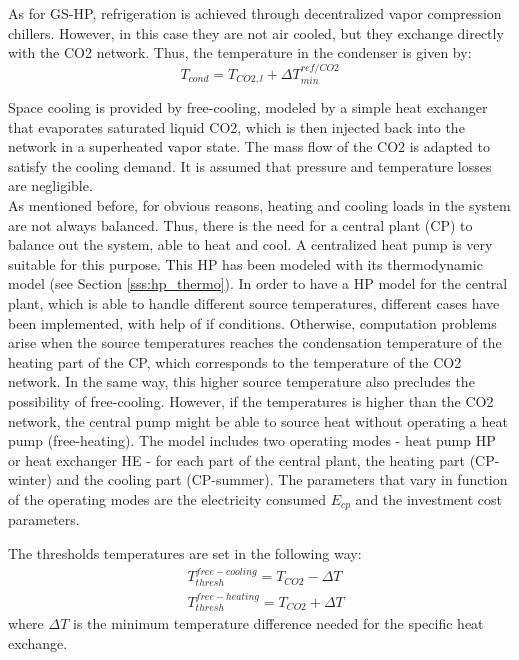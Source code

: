 \documentclass{article}
\begin{document}
As for GS-HP, refrigeration is achieved through decentralized vapor compression chillers. However, in this case they are not air cooled, but they exchange directly with the CO2 network. Thus, the temperature in the condenser is given by:
\begin{equation}
    T_{cond} = T_{CO2,l} + \Delta T_{min}^{ref/CO2}
\end{equation}

Space cooling is provided by free-cooling, modeled by a simple heat exchanger that evaporates saturated liquid CO2, which is then injected back into the network in a superheated vapor state. The mass flow of the CO2 is adapted to satisfy the cooling demand. It is assumed that pressure and temperature losses are negligible.\\

As mentioned before, for obvious reasons, heating and cooling loads in the system are not always balanced. Thus, there is the need for a central plant (CP) to balance out the system, able to heat and cool. A centralized heat pump is very suitable for this purpose. This HP has been modeled with its thermodynamic model (see Section \ref{sss:hp_thermo}).
In order to have a HP model for the central plant, which is able to handle different source temperatures, different cases have been implemented, with help of if conditions. Otherwise, computation problems arise when the source temperatures reaches the condensation temperature of the heating part of the CP, which corresponds to the temperature of the CO2 network. In the same way, this higher source temperature also precludes the possibility of free-cooling. However, if the temperatures is higher than the CO2 network, the central pump might be able to source heat without operating a heat pump (free-heating). The model includes two operating modes - heat pump HP or heat exchanger HE - for each part of the central plant, the heating part (CP-winter) and the cooling part (CP-summer). The parameters that vary in function of the operating modes are the electricity consumed $E_{cp}$ and the investment cost parameters. 

The thresholds temperatures are set in the following way:
\begin{align}
& T_{thresh}^{free-cooling} = T_{CO2} - \Delta T \\
& T_{thresh}^{free-heating} = T_{CO2} + \Delta T 
\end{align}
where $\Delta T$ is the minimum temperature difference needed for the specific heat exchange.
\end{document}
